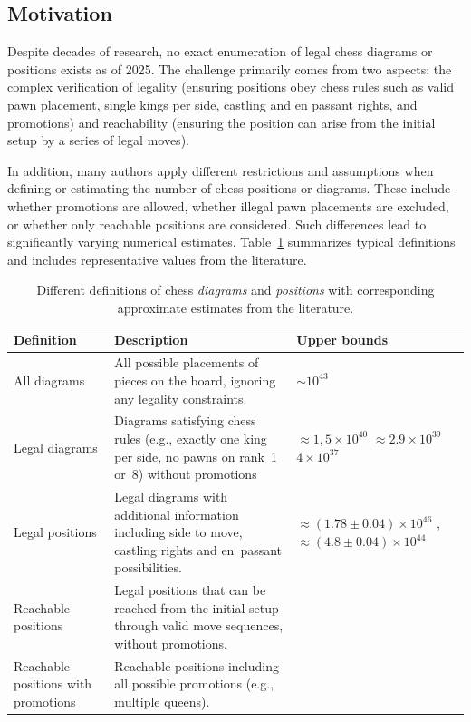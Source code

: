 \documentclass[12pt]{article}
\begin{document}
\subsection{Motivation}

Despite decades of research, no exact enumeration of legal chess diagrams or positions exists as of 2025. 
The challenge primarily comes from two aspects: the complex verification of legality 
(ensuring positions obey chess rules such as valid pawn placement, single kings per side, 
castling and en passant rights, and promotions) and reachability 
(ensuring the position can arise from the initial setup by a series of legal moves). 

In addition, many authors apply different restrictions and assumptions when defining or estimating 
the number of chess positions or diagrams. These include whether promotions are allowed, whether illegal pawn 
placements are excluded, or whether only reachable positions are considered. Such differences lead 
to significantly varying numerical estimates. Table~\ref{tab:definitions} summarizes typical definitions 
and includes representative values from the literature.

\begin{table}[h!]
\centering
\renewcommand{\arraystretch}{1.3}
\begin{tabular}{p{3.8cm} p{6.2cm} p{4.9cm}}
\toprule
\textbf{Definition} & \textbf{Description} & \textbf{Upper bounds} \\
\midrule
All diagrams & All possible placements of pieces on the board, ignoring any legality constraints. 
& $\sim 10^{43}$ \cite{shannon1950} \\[0.3em]

Legal diagrams & Diagrams satisfying chess rules (e.g., exactly one king per side, no pawns on rank~1 or~8) without promotions 
& $\approx 1,5\times10^{40}$ \cite{steinerberger2015} $\approx 2.9\times10^{39}$ \cite{tromp2021b} $4\times 10^{37}$ \cite{gourion2021} \\[0.3em]

Legal positions & Legal diagrams with additional information including side to move, castling rights and en~passant possibilities. 
& $\approx (1.78\pm0.04)\times10^{46}$ \cite{chinchalkar1996} , $\approx (4.8\pm0.04)\times10^{44}$ \cite{tromp2021b} \\[0.3em]

Reachable positions & Legal positions that can be reached from the initial setup through valid move sequences, without promotions. 
&  \\[0.3em]

Reachable positions with promotions & Reachable positions including all possible promotions (e.g., multiple queens). 
& \\
\bottomrule
\end{tabular}
\caption{Different definitions of chess \textit{diagrams} and \textit{positions} with corresponding approximate estimates from the literature.}
\label{tab:definitions}
\end{table}
\end{document}
